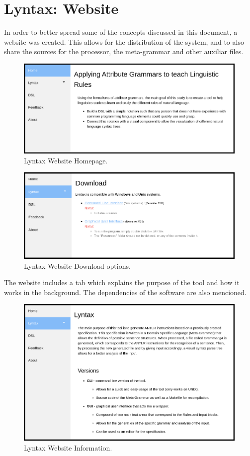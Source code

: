 \section{Lyntax: Website}

In order to better spread some of the concepts discussed in this document, a website was created.
This allows for the distribution of the system, and to also share the sources for the processor, the meta-grammar and other auxiliar files.
\begin{figure}[h]
    \centering
    \includegraphics[width=12cm]{images/lyntax-website-home.png}
    \caption{Lyntax Website Homepage.}
    \label{fig:lyntaxWebsiteHomepage}
\end{figure}

\begin{figure}[h]
    \centering
    \includegraphics[width=12cm]{images/lyntax-website-download.png}
    \caption{Lyntax Website Download options.}
    \label{fig:lyntaxWebsiteDownload}
\end{figure}

The website includes a tab which explains the purpose of the tool and how it works in the background. The dependencies of the software are also mencioned.
\begin{figure}[h]
    \centering
    \includegraphics[width=12cm]{images/lyntax-website-info.png}
    \caption{Lyntax Website Information.}
    \label{fig:lyntaxWebsiteInformation}
\end{figure}

